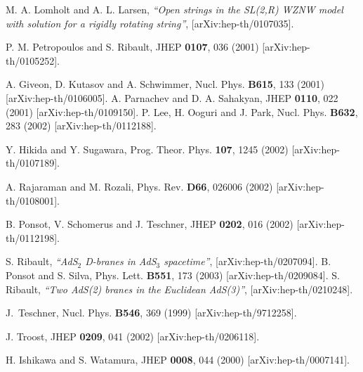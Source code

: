 \documentclass[a4paper,12pt]{article}
\begin{document}
\begin{thebibliography}{99}
  M. A. Lomholt and A. L. Larsen, \textit{``Open strings in
the SL(2,R) WZNW model with solution for a rigidly rotating
string''}, [arXiv:hep-th/0107035].

  P. M. Petropoulos and S. Ribault,
JHEP {\bf 0107}, 036 (2001) [arXiv:hep-th/0105252].

 A. Giveon, D. Kutasov and A. Schwimmer,
Nucl. Phys. \textbf{B615}, 133 (2001) [arXiv:hep-th/0106005].
\newline
A. Parnachev and D. A. Sahakyan, %
JHEP \textbf{0110}, 022 (2001) [arXiv:hep-th/0109150]. \newline
P. Lee, H. Ooguri and J. Park,
Nucl. Phys. \textbf{B632}, 283 (2002) [arXiv:hep-th/0112188].

 Y. Hikida and Y. Sugawara,
Prog. Theor. Phys. \textbf{107}, 1245 (2002)
[arXiv:hep-th/0107189].

  A. Rajaraman and M. Rozali,
Phys. Rev. \textbf{D66}, 026006 (2002) [arXiv:hep-th/0108001].

  B. Ponsot, V. Schomerus and J. Teschner,
JHEP \textbf{0202}, 016 (2002) [arXiv:hep-th/0112198].

  S. Ribault, \textit{``AdS$_{2}$ D-branes in AdS$_{3}$
spacetime''}, [arXiv:hep-th/0207094].
\newline
B. Ponsot and S. Silva,
Phys. Lett. {\bf B551}, 173 (2003) [arXiv:hep-th/0209084].
\newline S. Ribault, \textit{``Two AdS(2) branes in the Euclidean
AdS(3)''}, [arXiv:hep-th/0210248].

  J.~Teschner,
Nucl. Phys. \textbf{B546}, 369 (1999) [arXiv:hep-th/9712258].

  J. Troost,
JHEP \textbf{0209}, 041 (2002) [arXiv:hep-th/0206118].

  H. Ishikawa and S. Watamura,
JHEP \textbf{0008}, 044 (2000) [arXiv:hep-th/0007141].


\end{thebibliography}
\end{document}
